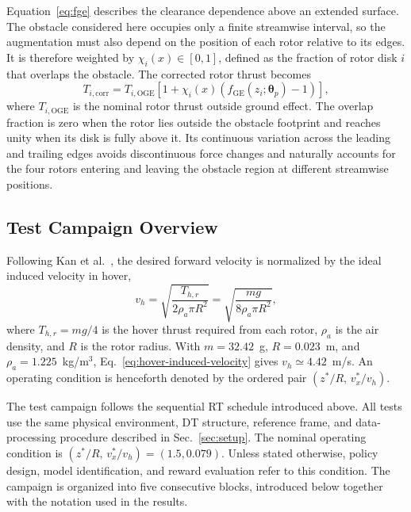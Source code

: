 \documentclass[journal]{IEEEtran}
\begin{document}
Equation~\eqref{eq:fge} describes the clearance dependence above an extended surface. The obstacle considered here occupies only a finite streamwise interval, so the augmentation must also depend on the position of each rotor relative to its edges. It is therefore weighted by $\chi_i(x)\in[0,1]$, defined as the fraction of rotor disk $i$ that overlaps the obstacle. The corrected rotor thrust becomes
\begin{equation}
 T_{i,\mathrm{corr}}=T_{i,\mathrm{OGE}}\left[1+\chi_i(x)\left(f_{\mathrm{GE}}(z_i;\boldsymbol{\theta}_p)-1\right)\right],
 \label{eq:corrected-thrust}
\end{equation}
where $T_{i,\mathrm{OGE}}$ is the nominal rotor thrust outside ground effect. The overlap fraction is zero when the rotor lies outside the obstacle footprint and reaches unity when its disk is fully above it. Its continuous variation across the leading and trailing edges avoids discontinuous force changes and naturally accounts for the four rotors entering and leaving the obstacle region at different streamwise positions. 

\subsection{Test Campaign Overview}
\label{sec:test-campaign}
Following Kan et al.~\cite{Kan2019}, the desired forward velocity is normalized by the ideal induced velocity in hover,
\begin{equation}
 v_h=\sqrt{\frac{T_{h,r}}{2\rho_a\pi R^2}}
 =\sqrt{\frac{mg}{8\rho_a\pi R^2}},
 \label{eq:hover-induced-velocity}
\end{equation}
where $T_{h,r}=mg/4$ is the hover thrust required from each rotor, $\rho_a$ is the air density, and $R$ is the rotor radius. With $m=32.42$~g, $R=0.023$~m, and $\rho_a=1.225$~kg/m$^3$, Eq.~\eqref{eq:hover-induced-velocity} gives $v_h\simeq4.42$~m/s. An operating condition is henceforth denoted by the ordered pair $(z^\ast/R,\,v_x^\ast/v_h)$.

The test campaign follows the sequential RT schedule introduced above. All tests use the same physical environment, DT structure, reference frame, and data-processing procedure described in Sec.~\ref{sec:setup}. The nominal operating condition is $(z^\ast/R,\,v_x^\ast/v_h)=(1.5,0.079)$. Unless stated otherwise, policy design, model identification, and reward evaluation refer to this condition. The campaign is organized into five consecutive blocks, introduced below together with the notation used in the results.
\end{document}
